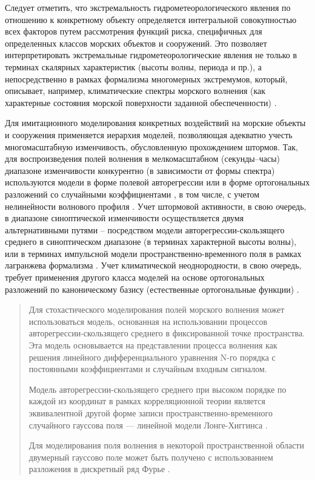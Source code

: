 Следует отметить, что экстремальность гидрометеорологического явления по отношению к конкретному объекту определяется интегральной совокупностью всех факторов путем рассмотрения функций риска, специфичных для определенных классов морских объектов и сооружений. Это позволяет интерпретировать экстремальные гидрометеорологические явления не только в терминах скалярных характеристик (высоты волны, периода и пр.), а непосредственно в рамках формализма многомерных экстремумов, который, описывает, например, климатические спектры морского волнения (как характерные состояния морской поверхности заданной обеспеченности) \citep{dk4}\citep{dk5}.

Для имитационного моделирования конкретных воздействий на морские объекты и сооружения применяется иерархия моделей, позволяющая адекватно учесть многомасштабную изменчивость, обусловленную прохождением штормов. Так, для воспроизведения полей волнения в мелкомасштабном (секунды--часы) диапазоне изменчивости конкурентно (в зависимости от формы спектра) используются модели в форме полевой авторегрессии \citep{dk6} или в форме ортогональных разложений со случайными коэффициентами \citep{dk7}, в том числе, с учетом нелинейности волнового профиля \citep{dk8}. Учет штормовой активности, в свою очередь, в диапазоне синоптической изменчивости осуществляется двумя альтернативными путями – посредством модели авторегрессии-скользящего среднего \citep{dk9} в синоптическом диапазоне (в терминах характерной высоты волны), или в терминах импульсной модели пространственно-временного поля в рамках лагранжева формализма \citep{dk10}. Учет климатической неоднородности, в свою очередь, требует применения другого класса моделей на основе ортогональных разложений по каноническому базису (естественные ортогональные функции) \citep{dk11}.

\begin{quote}
Для стохастического моделирования полей морского волнения может использоваться модель, основанная на использовании процессов авторегрессии-скользящего среднего \citep{p295I_31} в фиксированной точке пространства. Эта модель основывается на представлении процесса волнения как решения линейного дифференциального уравнения N-го порядка с постоянными коэффициентами и случайным входным сигналом.

Модель авторегрессии-скользящего среднего при высоком порядке по каждой из координат в рамках корреляционной теории является эквивалентной другой форме записи пространственно-временного случайного гауссова поля –-- линейной модели Лонге-Хиггинса \citep{p295I_45}.

Для моделирования поля волнения в некоторой пространственной области двумерный гауссово поле может быть получено с использованием разложения в дискретный ряд Фурье \citep{krogstad89}.
\end{quote}

